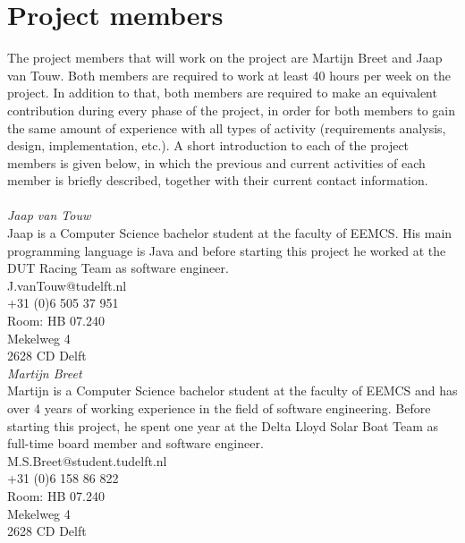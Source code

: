 \section{Project members}
\label{sec:proj_mem}
The project members that will work on the project are Martijn Breet and Jaap van Touw. Both members are required to work at least 40 hours per week on the project. In addition to that, both members are required to make an equivalent contribution during every phase of the project, in order for both members to gain the same amount of experience with all types of activity (requirements analysis, design, implementation, etc.). A short introduction to each of the project members is given below, in which the previous and current activities of each member is briefly described, together with their current contact information.\\
\noindent\\
\textit{Jaap van Touw}\\
Jaap is a Computer Science bachelor student at the faculty of EEMCS. His main programming language is Java and before starting this project he worked at the DUT Racing Team as software engineer.\\

\noindent
J.vanTouw@tudelft.nl\\
+31 (0)6 505 37 951\\
Room: HB 07.240\\
Mekelweg 4\\
2628 CD Delft\\

\noindent
\textit{Martijn Breet}\\
Martijn is a Computer Science bachelor student at the faculty of EEMCS and has over 4 years of working experience in the field of software engineering.  Before starting this project, he spent one year at the Delta Lloyd Solar Boat Team as full-time board member and software engineer.\\

\noindent
M.S.Breet@student.tudelft.nl \\
+31 (0)6 158 86 822\\
Room: HB 07.240\\
Mekelweg 4\\
2628 CD Delft\\